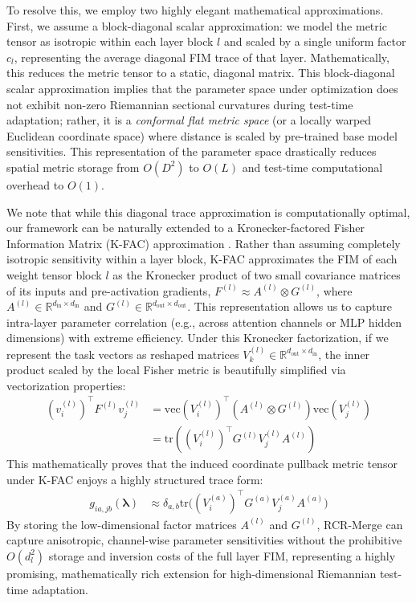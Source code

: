 To resolve this, we employ two highly elegant mathematical approximations. First, we assume a block-diagonal scalar approximation: we model the metric tensor as isotropic within each layer block $l$ and scaled by a single uniform factor $c_l$, representing the average diagonal FIM trace of that layer. Mathematically, this reduces the metric tensor to a static, diagonal matrix. This block-diagonal scalar approximation implies that the parameter space under optimization does not exhibit non-zero Riemannian sectional curvatures during test-time adaptation; rather, it is a \emph{conformal flat metric space} (or a locally warped Euclidean coordinate space) where distance is scaled by pre-trained base model sensitivities. This representation of the parameter space drastically reduces spatial metric storage from $O(D^2)$ to $O(L)$ and test-time computational overhead to $O(1)$. 

We note that while this diagonal trace approximation is computationally optimal, our framework can be naturally extended to a Kronecker-factored Fisher Information Matrix (K-FAC) approximation \citep{kfac}. Rather than assuming completely isotropic sensitivity within a layer block, K-FAC approximates the FIM of each weight tensor block $l$ as the Kronecker product of two small covariance matrices of its inputs and pre-activation gradients, $F^{(l)} \approx A^{(l)} \otimes G^{(l)}$, where $A^{(l)} \in \mathbb{R}^{d_{\text{in}} \times d_{\text{in}}}$ and $G^{(l)} \in \mathbb{R}^{d_{\text{out}} \times d_{\text{out}}}$. This representation allows us to capture intra-layer parameter correlation (e.g., across attention channels or MLP hidden dimensions) with extreme efficiency. Under this Kronecker factorization, if we represent the task vectors as reshaped matrices $V_k^{(l)} \in \mathbb{R}^{d_{\text{out}} \times d_{\text{in}}}$, the inner product scaled by the local Fisher metric is beautifully simplified via vectorization properties:
\begin{align}
(v_i^{(l)})^\top F^{(l)} v_j^{(l)} &= \text{vec}(V_i^{(l)})^\top \left( A^{(l)} \otimes G^{(l)} \right) \text{vec}(V_j^{(l)}) \nonumber \\
&= \text{tr}\left( (V_i^{(l)})^\top G^{(l)} V_j^{(l)} A^{(l)} \right)
\end{align}
This mathematically proves that the induced coordinate pullback metric tensor under K-FAC enjoys a highly structured trace form:
\begin{align}
g_{ia, jb}(\boldsymbol{\lambda}) &\approx \delta_{a, b} \text{tr}\Big( (V_i^{(a)})^\top G^{(a)} V_j^{(a)} A^{(a)} \Big)
\end{align}
By storing the low-dimensional factor matrices $A^{(l)}$ and $G^{(l)}$, RCR-Merge can capture anisotropic, channel-wise parameter sensitivities without the prohibitive $O(d_l^2)$ storage and inversion costs of the full layer FIM, representing a highly promising, mathematically rich extension for high-dimensional Riemannian test-time adaptation.

